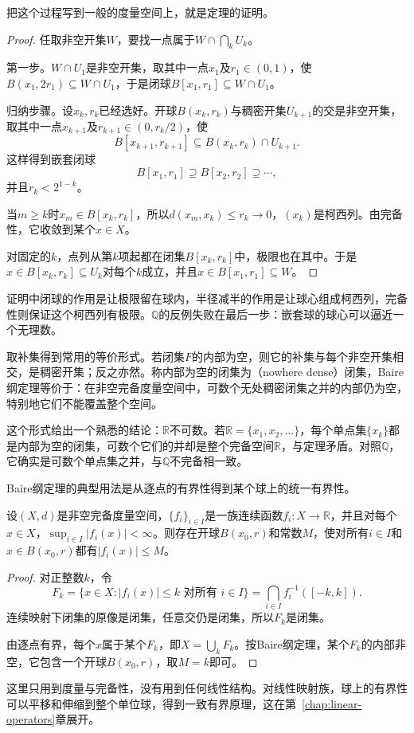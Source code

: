 把这个过程写到一般的度量空间上，就是定理的证明。

\begin{proof}
任取非空开集$W$，要找一点属于$W\cap\bigcap_kU_k$。

第一步。$W\cap U_1$是非空开集，取其中一点$x_1$及$r_1\in(0,1)$，使$B(x_1,2r_1)\subseteq W\cap U_1$，于是闭球$B[x_1,r_1]\subseteq W\cap U_1$。

归纳步骤。设$x_k,r_k$已经选好。开球$B(x_k,r_k)$与稠密开集$U_{k+1}$的交是非空开集，取其中一点$x_{k+1}$及$r_{k+1}\in(0,r_k/2)$，使
\[
B[x_{k+1},r_{k+1}]\subseteq B(x_k,r_k)\cap U_{k+1}.
\]
这样得到嵌套闭球
\[
B[x_1,r_1]\supseteq B[x_2,r_2]\supseteq\cdots,
\]
并且$r_k<2^{1-k}$。

当$m\geq k$时$x_m\in B[x_k,r_k]$，所以$d(x_m,x_k)\leq r_k\to0$，$(x_k)$是柯西列。由完备性，它收敛到某个$x\in X$。

对固定的$k$，点列从第$k$项起都在闭集$B[x_k,r_k]$中，极限也在其中。于是$x\in B[x_k,r_k]\subseteq U_k$对每个$k$成立，并且$x\in B[x_1,r_1]\subseteq W$。
\end{proof}

证明中闭球的作用是让极限留在球内，半径减半的作用是让球心组成柯西列，完备性则保证这个柯西列有极限。$\mathbb Q$的反例失败在最后一步：嵌套球的球心可以逼近一个无理数。

取补集得到常用的等价形式。若闭集$F$的内部为空，则它的补集与每个非空开集相交，是稠密开集；反之亦然。称内部为空的闭集为（nowhere dense）闭集，Baire纲定理等价于：在非空完备度量空间中，可数个无处稠密闭集之并的内部仍为空，特别地它们不能覆盖整个空间。

这个形式给出一个熟悉的结论：$\mathbb R$不可数。若$\mathbb R=\{x_1,x_2,\ldots\}$，每个单点集$\{x_k\}$都是内部为空的闭集，可数个它们的并却是整个完备空间$\mathbb R$，与定理矛盾。对照$\mathbb Q$，它确实是可数个单点集之并，与$\mathbb Q$不完备相一致。

Baire纲定理的典型用法是从逐点的有界性得到某个球上的统一有界性。

\begin{theorem}[逐点有界蕴含局部一致有界]
\label{thm:metric-baire-pointwise-bound}
设$(X,d)$是非空完备度量空间，$\{f_i\}_{i\in I}$是一族连续函数$f_i:X\to\mathbb R$，并且对每个$x\in X$，$\sup_{i\in I}\lvert f_i(x)\rvert<\infty$。则存在开球$B(x_0,r)$和常数$M$，使对所有$i\in I$和$x\in B(x_0,r)$都有$\lvert f_i(x)\rvert\leq M$。
\end{theorem}

\begin{proof}
对正整数$k$，令
\[
F_k=\{x\in X:\lvert f_i(x)\rvert\leq k\text{ 对所有 }i\in I\}=\bigcap_{i\in I}f_i^{-1}([-k,k]).
\]
连续映射下闭集的原像是闭集，任意交仍是闭集，所以$F_k$是闭集。

由逐点有界，每个$x$属于某个$F_k$，即$X=\bigcup_kF_k$。按Baire纲定理，某个$F_k$的内部非空，它包含一个开球$B(x_0,r)$，取$M=k$即可。
\end{proof}

这里只用到度量与完备性，没有用到任何线性结构。对线性映射族，球上的有界性可以平移和伸缩到整个单位球，得到一致有界原理，这在第~\ref{chap:linear-operators}章展开。
